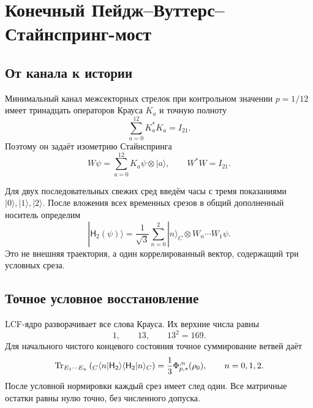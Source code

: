 \chapter{Конечный Пейдж--Вуттерс--Стайнспринг-мост}
\label{ch:v8-page-wootters-stinespring-history-gate}

\section{От канала к истории}

Минимальный канал межсекторных стрелок при контрольном значении $p=1/12$ имеет
тринадцать операторов Крауса $K_a$ и точную полноту
\begin{equation}
 \sum_{a=0}^{12}K_a^*K_a=I_{21}.
 \label{eq:v8-pw-kraus-completeness}
\end{equation}
Поэтому он задаёт изометрию Стайнспринга
\begin{equation}
 W\psi=\sum_{a=0}^{12}K_a\psi\otimes|a\rangle,
 \qquad W^*W=I_{21}.
 \label{eq:v8-pw-stinespring-isometry}
\end{equation}

Для двух последовательных свежих сред введём часы с тремя показаниями
$|0\rangle,|1\rangle,|2\rangle$. После вложения всех временных срезов в
общий дополненный носитель определим
\begin{equation}
 |\mathsf H_2(\psi)\rangle=
 \frac1{\sqrt3}\sum_{n=0}^{2}|n\rangle_C\otimes W_n\cdots W_1\psi.
 \label{eq:v8-pw-history-state}
\end{equation}
Это не внешняя траектория, а один коррелированный вектор, содержащий три
условных среза.

\section{Точное условное восстановление}

LCF-ядро разворачивает все слова Крауса. Их верхние числа равны
\begin{equation}
 1,\qquad13,\qquad13^2=169.
\end{equation}
Для начального чистого концевого состояния точное суммирование ветвей даёт
\begin{equation}
 \operatorname{Tr}_{E_1\cdots E_n}
 \left({}_C\langle n|\mathsf H_2\rangle
       \langle\mathsf H_2|n\rangle_C\right)
 =\frac13\Phi_{p,*}^{,n}(\rho_0),
 \qquad n=0,1,2.
 \label{eq:v8-pw-conditional-recovery}
\end{equation}
После условной нормировки каждый срез имеет след один. Все матричные остатки
равны нулю точно, без численного допуска.

